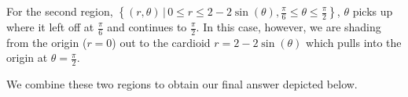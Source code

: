 \documentclass{ximera}
\begin{document}
\begin{example}
\begin{explanation}
\begin{enumerate}
For the second region,  $\left\{ (r,\theta) \, | \, 0\leq r \leq 2-2\sin(\theta),   \frac{\pi}{6} \leq \theta \leq \frac{\pi}{2} \right\}$,  $\theta$ picks up where it left off at $\frac{\pi}{6}$ and continues to $\frac{\pi}{2}$.  In this case, however, we are shading from the origin ($r=0$) out to the cardioid $r = 2-2\sin(\theta)$ which pulls into the origin at $\theta = \frac{\pi}{2}$. 

We combine these two regions to obtain our final answer depicted below.


\begin{center}
\end{center}

\end{enumerate}

 \end{explanation}

\end{example}



\closegraphsfile
\end{document}
